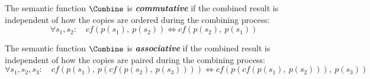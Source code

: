 \begin{definition}
	\label{def:commutative_combine}
	The semantic function $\Combine$ is \emph{\textbf{commutative}} if the combined 
	result is independent of how the copies are 
	ordered during the combining process:
	\begin{equation*}
		\forall s_1, s_2:
		\quad
		cf(p(s_1),~p(s_2))
		\Longleftrightarrow
		cf(p(s_2),~p(s_1))
	\end{equation*}
\end{definition}

\begin{definition}
	\label{def:associative_combine}
	The semantic function $\Combine$ is \emph{\textbf{associative}} if the combined 
	result is independent of how the copies are 
	paired during the combining process:
	\begin{equation*}
		\forall s_1, s_2, s_3:
		\quad
		cf(p(s_1),~p(cf(p(s_2),~p(s_3))))
		\Longleftrightarrow
		cf(p(cf(p(s_1),~p(s_2))),~p(s_3))
	\end{equation*}
\end{definition}

